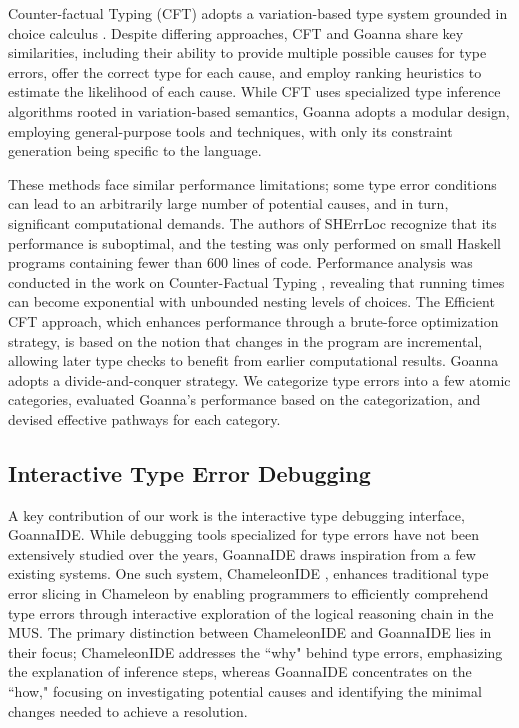 \documentclass[pdflatex,lineno,sn-nature,Numbered]{sn-jnl}%
\begin{document}
Counter-factual Typing (CFT) \cite{Chen2014-dz,Chen2020-ad,Chen2022-xb} adopts a variation-based type system grounded in choice calculus \cite{Erwig2011-cc}. Despite differing approaches, CFT and Goanna share key similarities, including their ability to provide multiple possible causes for type errors, offer the correct type for each cause, and employ ranking heuristics to estimate the likelihood of each cause. While CFT uses specialized type inference algorithms rooted in variation-based semantics, Goanna adopts a modular design, employing general-purpose tools and techniques, with only its constraint generation being specific to the language.

These methods face similar performance limitations; some type error conditions can lead to an arbitrarily large number of potential causes, and in turn, significant computational demands. The authors of SHErrLoc recognize that its performance is suboptimal, and the testing was only performed on small Haskell programs containing fewer than 600 lines of code.  Performance analysis was conducted in the work on Counter-Factual Typing \cite{Chen2014-dz}, revealing that running times can become exponential with unbounded nesting levels of choices. The Efficient CFT \cite{Chen2020-ad} approach, which enhances performance through a brute-force optimization strategy,  is based on the notion that changes in the program are incremental, allowing later type checks to benefit from earlier computational results. Goanna adopts a divide-and-conquer strategy. We categorize type errors into a few atomic categories, evaluated Goanna's performance based on the categorization, and devised effective pathways for each category.

\subsection{Interactive Type Error Debugging}
A key contribution of our work is the interactive type debugging interface, GoannaIDE. While debugging tools specialized for type errors have not been extensively studied over the years, GoannaIDE draws inspiration from a few existing systems. One such system, ChameleonIDE \cite{Fu2023-fm}, enhances traditional type error slicing in Chameleon \cite{Stuckey2003-pz} by enabling programmers to efficiently comprehend type errors through interactive exploration of the logical reasoning chain in the MUS. The primary distinction between ChameleonIDE and GoannaIDE lies in their focus; ChameleonIDE addresses the ``why" behind type errors, emphasizing the explanation of inference steps, whereas GoannaIDE concentrates on the ``how," focusing on investigating potential causes and identifying the minimal changes needed to achieve a resolution. 
\end{document}
